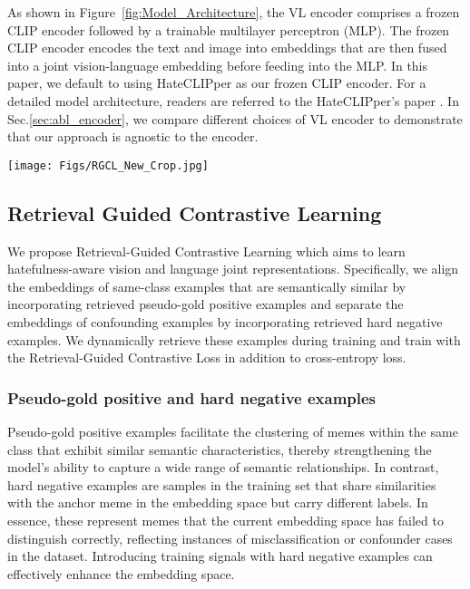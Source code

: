 \documentclass[11pt]{article}
\begin{document}
As shown in Figure~\ref{fig:Model_Architecture}, the VL encoder comprises a frozen CLIP encoder followed by a trainable multilayer perceptron (MLP). The frozen CLIP encoder encodes the text and image into embeddings that are then fused into a joint vision-language embedding before feeding into the MLP.
In this paper, we default to using HateCLIPper as our frozen CLIP encoder. For a detailed model architecture, readers are referred to the HateCLIPper's paper \cite{KumarHateClip2022}. In Sec.\ref{sec:abl_encoder}, we compare different choices of VL encoder to demonstrate that our approach is agnostic to the encoder.

\begin{figure*}
    \centering
    \texttt{[image: Figs/RGCL\_New\_Crop.jpg]}
    \caption{Model overview. (1) Using Vision-Language (VL) Encoder  to extract the joint vision-language representation for a training example . Additionally, the VL Encoder encodes the training memes into a retrieval database . (2) During training, pseudo-gold and hard negative examples are obtained using the Faiss nearest neighbour search. During inference,  nearest neighbours are obtained using the same querying process to perform the KNN-based inference. (3) During training, we optimise the joint loss function . (4) For inference, we demonstrate the result with conventional logistic classifier and retrieval-based KNN mahority voting.  }
    \label{fig:Model_Architecture}
\end{figure*}
\subsection{Retrieval Guided Contrastive Learning}
We propose Retrieval-Guided Contrastive Learning which aims to learn hatefulness-aware vision and language joint representations. Specifically, we align the embeddings of same-class examples that are semantically similar by incorporating retrieved pseudo-gold positive examples and separate the embeddings of confounding examples by incorporating retrieved hard negative examples. We dynamically retrieve these examples during training and train with the Retrieval-Guided Contrastive Loss in addition to cross-entropy loss.
\subsubsection{Pseudo-gold positive and hard negative examples}
Pseudo-gold positive examples facilitate the clustering of memes within the same class that exhibit similar semantic characteristics, thereby strengthening the model's ability to capture a wide range of semantic relationships.
In contrast, hard negative examples are samples in the training set that share similarities with the anchor meme in the embedding space but carry different labels. In essence, these represent memes that the current embedding space has failed to distinguish correctly, reflecting instances of misclassification or confounder cases in the dataset. Introducing training signals with hard negative examples can effectively enhance the embedding space.
\end{document}
